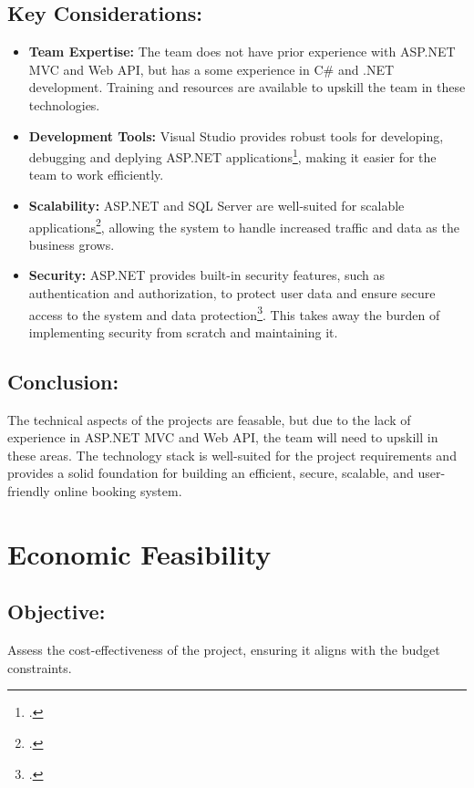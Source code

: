 \subsection*{Key Considerations:}
\label{subsec:tf-key-considerations}

\begin{itemize}
    \item \textbf{Team Expertise:} The team does not have prior experience with ASP.NET MVC and Web API, but has a some experience in C\# and .NET development. Training and resources are available to upskill the team in these technologies.
    \item \textbf{Development Tools:} Visual Studio provides robust tools for developing, debugging and deplying ASP.NET applications\footcite[][]{missing}, making it easier for the team to work efficiently.
    \item \textbf{Scalability:} ASP.NET and SQL Server are well-suited for scalable applications\footcite[][]{missing}, allowing the system to handle increased traffic and data as the business grows.
    \item \textbf{Security:} ASP.NET provides built-in security features, such as authentication and authorization, to protect user data and ensure secure access to the system and data protection\footcite[][]{missing}. This takes away the burden of implementing security from scratch and maintaining it.
\end{itemize}

\subsection*{Conclusion:}
\label{subsec:tf-conclusion}
The technical aspects of the projects are feasable, but due to the lack of experience in ASP.NET MVC and Web API, the team will need to upskill in these areas. The technology stack is well-suited for the project requirements and provides a solid foundation for building an efficient, secure, scalable, and user-friendly online booking system.

\section{Economic Feasibility}
\label{sec:economic-feasibility}

\subsection*{Objective:}
\label{subsec:ef-objective}
Assess the cost-effectiveness of the project, ensuring it aligns with the budget constraints.

